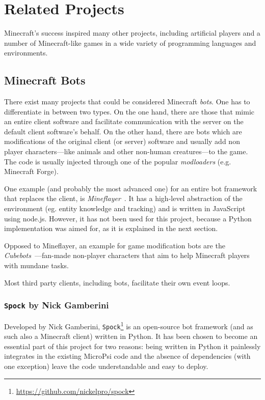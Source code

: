     \section{Related Projects}
    \label{sec:3:relatedprojects}
Minecraft's success inspired many other projects, including artificial players and a number of Minecraft-like games in a wide variety of programming languages and environments.


        \subsection{Minecraft Bots}
There exist many projects that could be considered Minecraft \emph{bots}. One has to differentiate in between two types. On the one hand, there are those that mimic an entire client software and facilitate communication with the server on the default client software's behalf. On the other hand, there are bots which are modifications of the original client (or server) software and usually add non player characters---like animals and other non-human creatures---to the game. The code is usually injected through one of the popular \emph{modloaders} (e.g. Minecraft Forge).

One example (and probably the most advanced one) for an entire bot framework that replaces the client, is \emph{Mineflayer}~\cite{github_mineflayer}. It has a high-level abstraction of the environment (eg. entity knowledge and tracking) and is written in JavaScript using node.js. However, it has not been used for this project, because a Python implementation was aimed for, as it is explained in the next section.

Opposed to Mineflayer, an example for game modification bots are the \emph{Cubebots}~\cite{mcforums_cubebot}---fan-made non-player characters that aim to help Minecraft players with mundane tasks.

Most third party clients, including bots, facilitate their own event loops. 

    \subsubsection{\texttt{Spock} by Nick Gamberini}
Developed by Nick Gamberini, \texttt{Spock}\footnote{\url{https://github.com/nickelpro/spock}} is an open-source bot framework (and as such also a Minecraft client) written in Python. It has been chosen to become an essential part of this project for two reasons: being written in Python it painlessly integrates in the existing MicroPsi code and the absence of dependencies (with one exception) leave the code understandable and easy to deploy.
    
